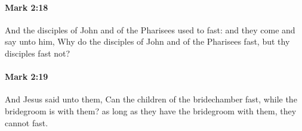 		\paragraph{Mark 2:18} %
			\label{MARK-2-18}

			And the disciples of John and of the Pharisees used to fast: and they come and say unto him, Why do the disciples of John and of the Pharisees fast, but thy disciples fast not?

			\begin{framed}
			\scriptsize
				\begin{compactdesc}
					\item[SBLG] 
				\end{compactdesc}
			\end{framed}

		\paragraph{Mark 2:19} %
			\label{MARK-2-19}

			And Jesus said unto them, Can the children of the bridechamber fast, while the bridegroom is with them? as long as they have the bridegroom with them, they cannot fast.

